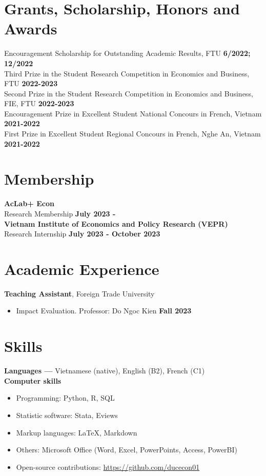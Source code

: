 \documentclass[margin,line]{res}
\begin{document}
\begin{resume}
\section{\sc Grants, Scholarship, Honors and Awards}
Encouragement Scholarship for Outstanding Academic Results, FTU \hfill \textbf{6/2022; 12/2022}\\
Third Prize in the Student Research Competition in Economics and Business, FTU \hfill  \textbf{2022-2023}\\
Second Prize in the Student Research Competition in Economics and Business, FIE, FTU \hfill \textbf{2022-2023}\\
Encouragement Prize in Excellent Student National Concours in French, Vietnam \hfill \textbf{2021-2022}\\
First Prize in Excellent Student Regional Concours in French, Nghe An, Vietnam \hfill \textbf{2021-2022}\\

\vspace{4mm}

\section{\sc Membership}

\textbf{AcLab+ Econ}\\
Research Membership \hfill \textbf{July 2023 - }\\
\textbf{Vietnam Institute of Economics and Policy Research (VEPR)}\\
Research Internship \hfill \textbf{July 2023 - October 2023}

\section{\sc Academic Experience}
{\bf Teaching Assistant}, Foreign Trade University
\begin{itemize}
\item[ ] Impact Evaluation. Professor: Do Ngoc Kien \hfill \textbf{Fall 2023}
\end{itemize}

\vspace{4mm}

\section{\sc Skills}
{\bf Languages ---}
\vspace*{.05in}
Vietnamese (native), English (B2), French (C1)\\
{\bf Computer skills}
\vspace*{.05in}
\begin{itemize}
	\item Programming: Python, R, SQL
        \item Statistic software: Stata, Eviews
	\item Markup languages: \LaTeX, Markdown
        \item Others: Microsoft Office (Word, Excel, PowerPoints, Access, PowerBI)
	\item Open-source contributions: \url{https://github.com/ducecon01}
\end{itemize}


\end{resume}
\end{document}
